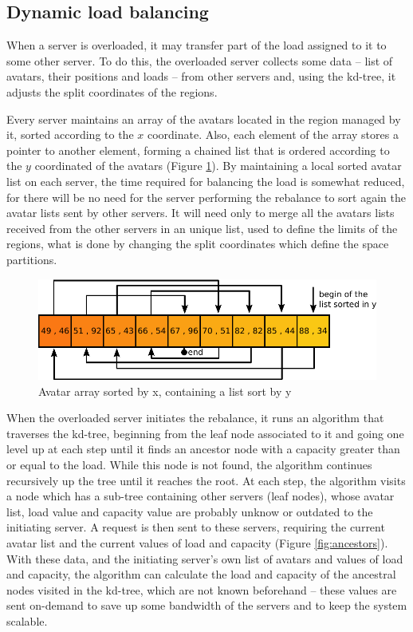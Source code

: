 \documentclass[acmjacm]{acmtrans2m}
\newcommand{\figurecaption}{Figure}
\begin{document}
\subsection{Dynamic load balancing}

When a server is overloaded, it may transfer part of the load assigned to it to some other server. To do this, the overloaded server collects some data -- list of avatars, their positions and loads -- from other servers and, using the kd-tree, it adjusts the split coordinates of the regions.

Every server maintains an array of the avatars located in the region managed by it, sorted according to the $x$ coordinate. Also, each element of the array stores a pointer to another element, forming a chained list that is ordered according to the $y$ coordinated of the avatars (\figurecaption{} \ref{fig:vectorxlisty}). By maintaining a local sorted avatar list on each server, the time required for balancing the load is somewhat reduced, for there will be no need for the server performing the rebalance to sort again the avatar lists sent by other servers. It will need only to merge all the avatars lists received from the other servers in an unique list, used to define the limits of the regions, what is done by changing the split coordinates which define the space partitions.

\begin{figure}
  \centering
  \includegraphics[width=0.9\linewidth]{images/vectorxlisty}
  \caption{Avatar array sorted by x, containing a list sort by y}
   \label{fig:vectorxlisty}
\end{figure}

When the overloaded server initiates the rebalance, it runs an algorithm that traverses the kd-tree, beginning from the leaf node associated to it and going one level up at each step until it finds an ancestor node with a capacity greater than or equal to the load. While this node is not found, the algorithm continues recursively up the tree until it reaches the root. At each step, the algorithm visits a node which has a sub-tree containing other servers (leaf nodes), whose avatar list, load value and capacity value are probably unknow or outdated to the initiating server. A request is then sent to these servers, requiring the current avatar list and the current values of load and capacity (\figurecaption{} \ref{fig:ancestors}). With these data, and the initiating server's own list of avatars and values of load and capacity, the algorithm can calculate the load and capacity of the ancestral nodes visited in the kd-tree, which are not known beforehand -- these values are sent on-demand to save up some bandwidth of the servers and to keep the system scalable.
\end{document}
